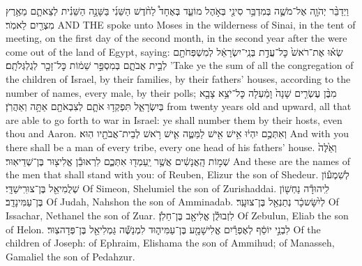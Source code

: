 \documentclass[11pt, openany]{book}
\begin{document}
	

	
\clearpage
\mainmatter

\setmainheader



\setcounter{chap}{1}
\setcounter{verse}{1}
\renewcommand{\aliya}[1]{\textsf{#1}}
{וַיְדַבֵּ֨ר יְהֹוָ֧ה אֶל־מֹשֶׁ֛ה בְּמִדְבַּ֥ר סִינַ֖י בְּאֹ֣הֶל מוֹעֵ֑ד בְּאֶחָד֩ לַחֹ֨דֶשׁ הַשֵּׁנִ֜י בַּשָּׁנָ֣ה הַשֵּׁנִ֗ית לְצֵאתָ֛ם מֵאֶ֥רֶץ מִצְרַ֖יִם לֵאמֹֽר׃}
{AND THE \lord\space spoke unto Moses in the wilderness of Sinai, in the tent of meeting, on the first day of the second month, in the second year after the were come out of the land of Egypt, saying:}
{שְׂא֗וּ אֶת־רֹאשׁ֙ כׇּל־עֲדַ֣ת בְּנֵֽי־יִשְׂרָאֵ֔ל לְמִשְׁפְּחֹתָ֖ם לְבֵ֣ית אֲבֹתָ֑ם בְּמִסְפַּ֣ר שֵׁמ֔וֹת כׇּל־זָכָ֖ר לְגֻלְגְּלֹתָֽם׃}
{’Take ye the sum of all the congregation of the children of Israel, by their families, by their fathers’ houses, according to the number of names, every male, by their polls;}
{מִבֶּ֨ן עֶשְׂרִ֤ים שָׁנָה֙ וָמַ֔עְלָה כׇּל־יֹצֵ֥א צָבָ֖א בְּיִשְׂרָאֵ֑ל תִּפְקְד֥וּ אֹתָ֛ם לְצִבְאֹתָ֖ם אַתָּ֥ה וְאַהֲרֹֽן׃}
{from twenty years old and upward, all that are able to go forth to war in Israel: ye shall number them by their hosts, even thou and Aaron.}
{וְאִתְּכֶ֣ם יִהְי֔וּ אִ֥ישׁ אִ֖ישׁ לַמַּטֶּ֑ה אִ֛ישׁ רֹ֥אשׁ לְבֵית־אֲבֹתָ֖יו הֽוּא׃}
{And with you there shall be a man of every tribe, every one head of his fathers’ house.}
{וְאֵ֙לֶּה֙ שְׁמ֣וֹת הָֽאֲנָשִׁ֔ים אֲשֶׁ֥ר יַֽעַמְד֖וּ אִתְּכֶ֑ם לִרְאוּבֵ֕ן אֱלִיצ֖וּר בֶּן־שְׁדֵיאֽוּר׃}
{And these are the names of the men that shall stand with you: of Reuben, Elizur the son of Shedeur.}
{לְשִׁמְע֕וֹן שְׁלֻמִיאֵ֖ל בֶּן־צוּרִֽישַׁדָּֽי׃}
{Of Simeon, Shelumiel the son of Zurishaddai.}
{לִֽיהוּדָ֕ה נַחְשׁ֖וֹן בֶּן־עַמִּינָדָֽב׃}
{Of Judah, Nahshon the son of Amminadab.}
{לְיִ֨שָּׂשכָ֔ר נְתַנְאֵ֖ל בֶּן־צוּעָֽר׃}
{Of Issachar, Nethanel the son of Zuar.}
{לִזְבוּלֻ֕ן אֱלִיאָ֖ב בֶּן־חֵלֹֽן׃}
{Of Zebulun, Eliab the son of Helon.}
{לִבְנֵ֣י יוֹסֵ֔ף לְאֶפְרַ֕יִם אֱלִישָׁמָ֖ע בֶּן־עַמִּיה֑וּד לִמְנַשֶּׁ֕ה גַּמְלִיאֵ֖ל בֶּן־פְּדָהצֽוּר׃}
{Of the children of Joseph: of Ephraim, Elishama the son of Ammihud; of Manasseh, Gamaliel the son of Pedahzur.}
\end{document}
